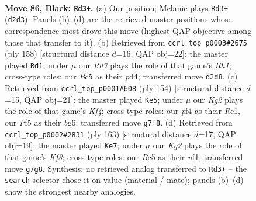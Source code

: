 \documentclass[11pt]{article}
\begin{document}
\clearpage

\begin{figure}[p]\centering
\begin{subfigure}{0.46\textwidth}\centering
\resizebox{\linewidth}{!}{%
\newchessgame
\chessboard[
  setfen={8/P5k1/R7/2b2p2/b4P2/7K/3r4/8 b - - 8 86},
  showmover=false,
  pgfstyle=straightmove, color=movearrow, markmove={d2-d3}
]}
\caption{}
\end{subfigure}\hfill
\begin{subfigure}{0.46\textwidth}\centering
\resizebox{\linewidth}{!}{%
\newchessgame
\chessboard[
  setfen={8/8/1p6/p5k1/P2p4/1r6/5K2/1B5R w - - 0 80},
  showmover=false,
  pgfstyle=straightmove, color=movearrow, markmove={h1-d1}
]}
\caption{}
\end{subfigure}
\\[4pt]
\begin{subfigure}{0.46\textwidth}\centering
\resizebox{\linewidth}{!}{%
\newchessgame
\chessboard[
  setfen={8/8/p5bk/8/r1BB1K2/8/8/2R5 w - - 9 78},
  showmover=false,
  pgfstyle=straightmove, color=movearrow, markmove={f4-e5}
]}
\caption{}
\end{subfigure}\hfill
\begin{subfigure}{0.46\textwidth}\centering
\resizebox{\linewidth}{!}{%
\newchessgame
\chessboard[
  setfen={3R4/8/3b1k2/8/4p3/4P2K/1r3P2/5N2 b - - 0 82},
  showmover=false,
  pgfstyle=straightmove, color=movearrow, markmove={f6-e7}
]}
\caption{}
\end{subfigure}
\caption{\textbf{Move 86, Black: \texttt{Rd3+}.} (a) Our position; Melanie plays \texttt{Rd3+} (\texttt{d2d3}). Panels (b)--(d) are the retrieved master positions whose correspondence most drove this move (highest QAP objective among those that transfer to it). (b) Retrieved from \texttt{ccrl\_top\_p0003\#2675} (ply 158) [structural distance $d$=16, QAP obj=22]: the master played \texttt{Rd1}; under $\mu$ our \emph{Rd7} plays the role of that game's \emph{Rh1}; cross-type roles: our \emph{B}c5 as their \emph{p}d4; transferred move \texttt{d2d8}. (c) Retrieved from \texttt{ccrl\_top\_p0001\#608} (ply 154) [structural distance $d$=15, QAP obj=21]: the master played \texttt{Ke5}; under $\mu$ our \emph{Kg2} plays the role of that game's \emph{Kf4}; cross-type roles: our \emph{p}f4 as their \emph{R}c1, our \emph{P}f5 as their \emph{b}g6; transferred move \texttt{g7f8}. (d) Retrieved from \texttt{ccrl\_top\_p0002\#2831} (ply 163) [structural distance $d$=17, QAP obj=19]: the master played \texttt{Ke7}; under $\mu$ our \emph{Kg2} plays the role of that game's \emph{Kf3}; cross-type roles: our \emph{B}c5 as their \emph{n}f1; transferred move \texttt{g7g8}. Synthesis: no retrieved analog transferred to \texttt{Rd3+} -- the \texttt{search} selector chose it on value (material / mate); panels (b)--(d) show the strongest nearby analogies.}
\label{fig:thought-m171}
\end{figure}
\end{document}
